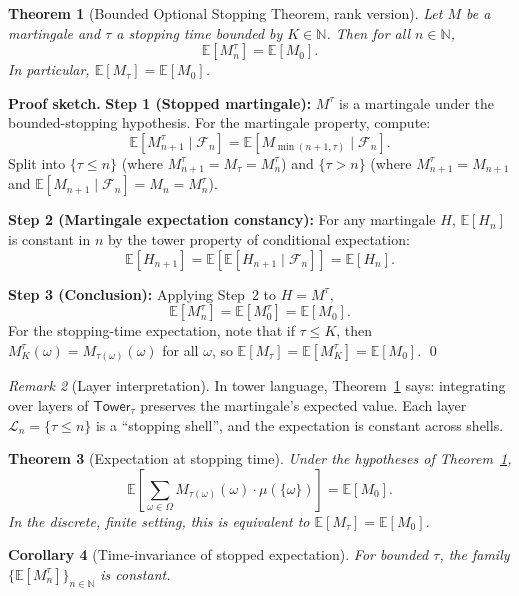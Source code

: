 \documentclass[11pt]{article}
\newtheorem{theorem}{Theorem}[section]
\newtheorem{corollary}[theorem]{Corollary}
\theoremstyle{definition}
\theoremstyle{remark}
\newtheorem{remark}[theorem]{Remark}
\newcommand{\layer}{\mathcal{L}}
\newcommand{\Tower}{\mathsf{Tower}}
\newcommand{\Filtration}{\mathcal{F}}
\newcommand{\NN}{\mathbb{N}}
\newcommand{\EE}{\mathbb{E}}
\begin{document}
\begin{theorem}[Bounded Optional Stopping Theorem, rank version]
\label{thm:rank-ost-bounded}
Let $M$ be a martingale and $\tau$ a stopping time bounded by $K \in \NN$.
Then for all $n \in \NN$,
\[
\EE[M^\tau_n] = \EE[M_0].
\]
In particular, $\EE[M_{\tau}] = \EE[M_0]$.
\end{theorem}

\noindent\textbf{Proof sketch.}
\textbf{Step 1 (Stopped martingale):} $M^\tau$ is a martingale under the bounded-stopping hypothesis.
For the martingale property, compute:
\[
\EE[M^\tau_{n+1} \mid \Filtration_n] = \EE[M_{\min(n+1, \tau)} \mid \Filtration_n].
\]
Split into $\{\tau \leq n\}$ (where $M^\tau_{n+1} = M_\tau = M^\tau_n$) and $\{\tau > n\}$ (where $M^\tau_{n+1} = M_{n+1}$ and $\EE[M_{n+1} \mid \Filtration_n] = M_n = M^\tau_n$).

\textbf{Step 2 (Martingale expectation constancy):} For any martingale $H$, $\EE[H_n]$ is constant in $n$ by the tower property of conditional expectation:
\[
\EE[H_{n+1}] = \EE[\EE[H_{n+1} \mid \Filtration_n]] = \EE[H_n].
\]

\textbf{Step 3 (Conclusion):} Applying Step~2 to $H = M^\tau$,
\[
\EE[M^\tau_n] = \EE[M^\tau_0] = \EE[M_0].
\]
For the stopping-time expectation, note that if $\tau \leq K$, then $M^\tau_K(\omega) = M_{\tau(\omega)}(\omega)$ for all $\omega$, so $\EE[M_\tau] = \EE[M^\tau_K] = \EE[M_0]$.
\qed

\begin{remark}[Layer interpretation]
\label{rem:layer-interp}
In tower language, Theorem~\ref{thm:rank-ost-bounded} says: integrating over layers of $\Tower_\tau$ preserves the martingale's expected value.
Each layer $\layer_n = \{\tau \leq n\}$ is a ``stopping shell'', and the expectation is constant across shells.
\end{remark}

\begin{theorem}[Expectation at stopping time]
\label{thm:ost-at-tau}
Under the hypotheses of Theorem~\ref{thm:rank-ost-bounded},
\[
\EE\left[\sum_{\omega \in \Omega} M_{\tau(\omega)}(\omega) \cdot \mu(\{\omega\})\right] = \EE[M_0].
\]
In the discrete, finite setting, this is equivalent to $\EE[M_\tau] = \EE[M_0]$.
\end{theorem}

\begin{corollary}[Time-invariance of stopped expectation]
\label{cor:time-invariance}
For bounded $\tau$, the family $\{\EE[M^\tau_n]\}_{n \in \NN}$ is constant.
\end{corollary}
\end{document}
